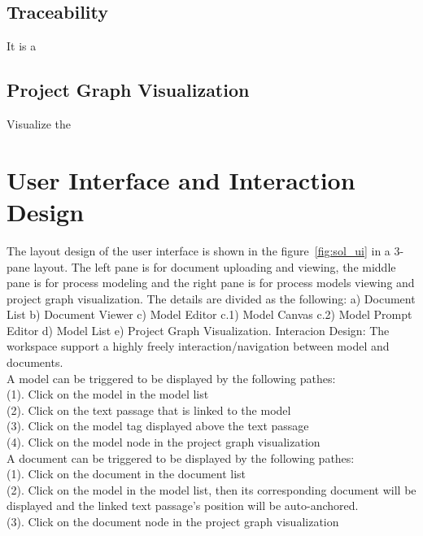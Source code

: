 \subsection{Traceability}
It is a 
\subsection{Project Graph Visualization}
Visualize the 

\section{User Interface and Interaction Design}
The layout design of the user interface is shown in the figure~\ref{fig:sol_ui} in a 3-pane layout. The left pane is for document uploading and viewing, the middle pane is for process modeling and the right pane is for process models viewing and project graph visualization. The details are divided as the following: a) Document List b) Document Viewer c) Model Editor c.1) Model Canvas c.2) Model Prompt Editor d) Model List e) Project Graph Visualization.
Interacion Design:
The workspace support a highly freely interaction/navigation between model and documents.\\
A model can be triggered to be displayed by the following pathes:\\
(1). Click on the model in the model list\\
(2). Click on the text passage that is linked to the model\\
(3). Click on the model tag displayed above the text passage \\
(4). Click on the model node in the project graph visualization\\
A document can be triggered to be displayed by the following pathes:\\
(1). Click on the document in the document list\\
(2). Click on the model in the model list, then its corresponding document will be displayed and the linked text passage's position will be auto-anchored.\\
(3). Click on the document node in the project graph visualization\\

